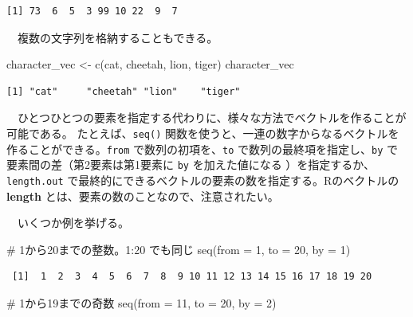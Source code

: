 \documentclass[
  a4paper,
  pandoc,
  ja=standard,
  jafont=haranoaji]{bxjsbook}
\newenvironment{Shaded}{\begin{snugshade}}{\end{snugshade}}
\newcommand{\AttributeTok}[1]{\textcolor[rgb]{0.00,0.48,0.65}{#1}}
\newcommand{\CommentTok}[1]{\textcolor[rgb]{0.37,0.37,0.37}{#1}}
\newcommand{\DecValTok}[1]{\textcolor[rgb]{0.68,0.00,0.00}{#1}}
\newcommand{\FunctionTok}[1]{\textcolor[rgb]{0.28,0.35,0.67}{#1}}
\newcommand{\NormalTok}[1]{\textcolor[rgb]{0.00,0.48,0.65}{#1}}
\newcommand{\OtherTok}[1]{\textcolor[rgb]{0.00,0.48,0.65}{#1}}
\newcommand{\StringTok}[1]{\textcolor[rgb]{0.13,0.47,0.30}{#1}}
\begin{document}
\begin{verbatim}
[1] 73  6  5  3 99 10 22  9  7
\end{verbatim}

　複数の文字列を格納することもできる。

\begin{Shaded}
\begin{Highlighting}[numbers=left,,]
\NormalTok{character\_vec }\OtherTok{\textless{}{-}} \FunctionTok{c}\NormalTok{(}\StringTok{\textquotesingle{}cat\textquotesingle{}}\NormalTok{, }\StringTok{\textquotesingle{}cheetah\textquotesingle{}}\NormalTok{, }\StringTok{\textquotesingle{}lion\textquotesingle{}}\NormalTok{,  }\StringTok{\textquotesingle{}tiger\textquotesingle{}}\NormalTok{)}
\NormalTok{character\_vec}
\end{Highlighting}
\end{Shaded}

\begin{verbatim}
[1] "cat"     "cheetah" "lion"    "tiger"  
\end{verbatim}

　ひとつひとつの要素を指定する代わりに、様々な方法でベクトルを作ることが可能である。
たとえば、\texttt{seq()}
関数を使うと、一連の数字からなるベクトルを作ることができる。\texttt{from}
で数列の初項を、\texttt{to} で数列の最終項を指定し、\texttt{by}
で要素間の差（第2要素は第1要素に \texttt{by} を加えた値になる
）を指定するか、\texttt{length.out}
で最終的にできるベクトルの要素の数を指定する。Rのベクトルの
\textbf{length} とは、要素の数のことなので、注意されたい。

　いくつか例を挙げる。

\begin{Shaded}
\begin{Highlighting}[numbers=left,,]
\CommentTok{\# 1から20までの整数。1:20 でも同じ}
\FunctionTok{seq}\NormalTok{(}\AttributeTok{from =}  \DecValTok{1}\NormalTok{, }\AttributeTok{to =}  \DecValTok{20}\NormalTok{, }\AttributeTok{by =} \DecValTok{1}\NormalTok{)}
\end{Highlighting}
\end{Shaded}

\begin{verbatim}
 [1]  1  2  3  4  5  6  7  8  9 10 11 12 13 14 15 16 17 18 19 20
\end{verbatim}

\begin{Shaded}
\begin{Highlighting}[numbers=left,,]
\CommentTok{\# 1から19までの奇数}
\FunctionTok{seq}\NormalTok{(}\AttributeTok{from =} \DecValTok{11}\NormalTok{, }\AttributeTok{to =}  \DecValTok{20}\NormalTok{, }\AttributeTok{by =} \DecValTok{2}\NormalTok{)}
\end{Highlighting}
\end{Shaded}
\end{document}
